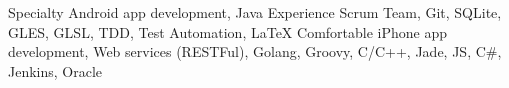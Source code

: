 
\begin{cvskills}
	\cvskill
		{Specialty}
		{Android app development, Java}
	\cvskill
		{Experience}
		{Scrum Team, Git, SQLite, GLES, GLSL, TDD, Test Automation, LaTeX}
	\cvskill
		{Comfortable}
		{iPhone app development, Web services (RESTFul), Golang, Groovy, C/C++, Jade, JS, C\#, Jenkins, Oracle}
\end{cvskills}

